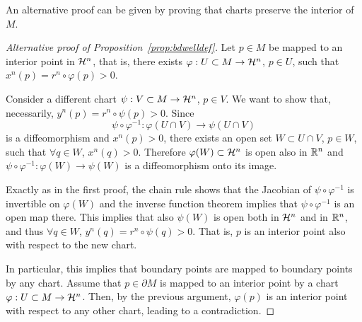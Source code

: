An alternative proof can be given by proving that charts preserve the interior of $M$.

\begin{proof}[Alternative proof of Proposition~\ref{prop:bdwelldef}]
	Let $p\in M$ be mapped to an interior point in $\mathcal{H}^n$, that is, there exists $\varphi: U\subset M \to \mathcal{H}^n$, $p\in U$, such that $x^n(p) = r^n\circ\varphi(p) > 0$.

	Consider a different chart $\psi:V\subset M\to \mathcal{H}^n$, $p\in V$.
	We want to show that, necessarily, $y^n(p) = r^n\circ\psi(p) > 0$. Since
	\begin{equation}\label{eq:trans-int-chart}
		\psi\circ\varphi^{-1} : \varphi(U\cap V) \to \psi(U\cap V)
	\end{equation}
	is a diffeomorphism and $x^n(p) > 0$, there exists an open set $W\subset U\cap V$, $p\in W$, such that $\forall q\in W$, $x^n(q) > 0$.
	Therefore $\varphi(W)\subset \mathcal{H}^n$ is open also in $\mathbb{R}^n$ and $\psi\circ\varphi^{-1} : \varphi(W) \to \psi(W)$ is a diffeomorphism onto its image.

	Exactly as in the first proof, the chain rule shows that the Jacobian of $\psi\circ\varphi^{-1}$ is invertible on $\varphi(W)$ and the inverse function theorem implies that $\psi\circ\varphi^{-1}$ is an open map there.
	This implies that also $\psi(W)$ is open both in $\mathcal{H}^n$ and in $\mathbb{R}^n$, and thus $\forall q \in W$, $y^n(q) = r^n\circ \psi(q) > 0$. That is, $p$ is an interior point also with respect to the new chart.

	In particular, this implies that boundary points are mapped to boundary points by any chart. Assume that $p\in\partial M$ is mapped to an interior point by a chart $\varphi: U\subset M \to \mathcal{H}^n$. Then, by the previous argument, $\varphi(p)$ is an interior point with respect to any other chart, leading to a contradiction.
\end{proof}

